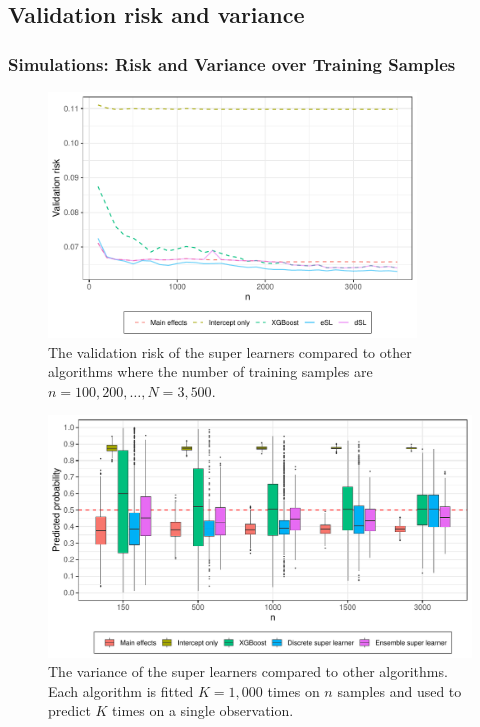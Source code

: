 \documentclass{beamer}
\begin{document}
\subsection{Validation risk and variance}
\begin{frame}
    \frametitle{Simulations: Risk and Variance over Training Samples} 
    \begin{figure}[H]
        \centering
        \includegraphics[width=0.87\textwidth]{figures/losses_esl_s22.pdf}
        \caption{The validation risk of the super learners compared to other algorithms where the number of training samples are $n = 100, 200, \dots , N = 3,500 $.}
        \label{fig:losses_esl_s22}
    \end{figure}
\end{frame}

\begin{frame}
\begin{figure}[H]
    \centering
    \includegraphics[width=\textwidth]{figures/learner_vars_w_esl_1000.pdf}
    \caption{The variance of the super learners compared to other algorithms. Each algorithm is fitted $ K = 1,000 $ times on $n$ samples and used to predict $ K $ times on a single observation.}
    \label{fig:learner_vars_w_esl_1000}
\end{figure}
\end{frame}
\end{document}
